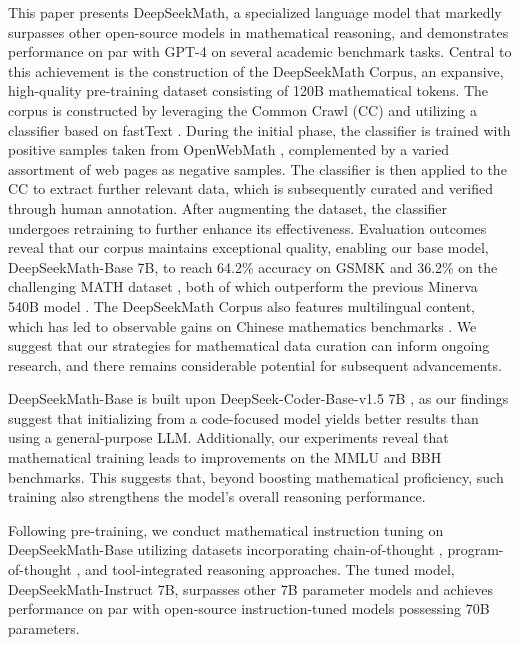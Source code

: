 This paper presents DeepSeekMath, a specialized language model that markedly surpasses other open-source models in mathematical reasoning, and demonstrates performance on par with GPT-4 on several academic benchmark tasks. Central to this achievement is the construction of the DeepSeekMath Corpus, an expansive, high-quality pre-training dataset consisting of 120B mathematical tokens. The corpus is constructed by leveraging the Common Crawl (CC) and utilizing a classifier based on fastText \citep{joulin2016fasttext}. During the initial phase, the classifier is trained with positive samples taken from OpenWebMath \citep{openwebmath}, complemented by a varied assortment of web pages as negative samples. The classifier is then applied to the CC to extract further relevant data, which is subsequently curated and verified through human annotation. After augmenting the dataset, the classifier undergoes retraining to further enhance its effectiveness. Evaluation outcomes reveal that our corpus maintains exceptional quality, enabling our base model, DeepSeekMath-Base 7B, to reach 64.2\% accuracy on GSM8K \citep{gsm8k} and 36.2\% on the challenging MATH dataset \citep{MATH}, both of which outperform the previous Minerva 540B model \citep{minerva}. The DeepSeekMath Corpus also features multilingual content, which has led to observable gains on Chinese mathematics benchmarks \citep{wei2023cmath,agieval}. We suggest that our strategies for mathematical data curation can inform ongoing research, and there remains considerable potential for subsequent advancements.

DeepSeekMath-Base is built upon DeepSeek-Coder-Base-v1.5 7B \citep{deepseek-coder}, as our findings suggest that initializing from a code-focused model yields better results than using a general-purpose LLM. Additionally, our experiments reveal that mathematical training leads to improvements on the MMLU \citep{mmlu} and BBH \citep{bbh} benchmarks. This suggests that, beyond boosting mathematical proficiency, such training also strengthens the model’s overall reasoning performance.

Following pre-training, we conduct mathematical instruction tuning on DeepSeekMath-Base utilizing datasets incorporating chain-of-thought \citep{cot}, program-of-thought \citep{pot,pal}, and tool-integrated reasoning \citep{tora} approaches. The tuned model, DeepSeekMath-Instruct 7B, surpasses other 7B parameter models and achieves performance on par with open-source instruction-tuned models possessing 70B parameters.

